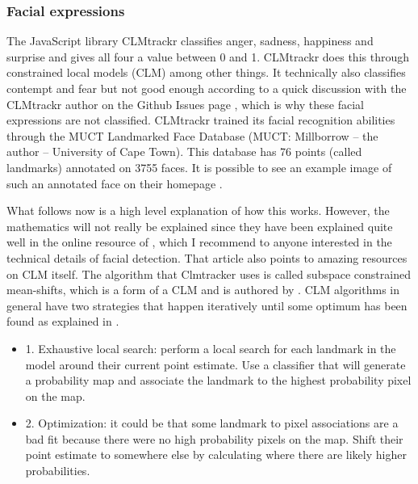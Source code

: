 \subsubsection{Facial expressions}
The JavaScript library CLMtrackr classifies anger, sadness, happiness and surprise and gives all four a value between 0 and 1. 
CLMtrackr does this through constrained local models (CLM) among other things. It technically also classifies contempt and fear but not good enough according to a quick discussion with the CLMtrackr author on the Github Issues page \cite{github_issue_clmtrackr}, which is why these facial expressions are not classified. CLMtrackr trained its facial recognition abilities through the MUCT Landmarked Face Database (MUCT: Millborrow -- the author -- University of Cape Town)\cite{milborrow2010}. This database has 76 points (called landmarks) annotated on 3755 faces. It is possible to see an example image of such an annotated face on their homepage \cite{milborrow2010}. 

What follows now is a high level explanation of how this works. However, the mathematics will not really be explained since they have been explained quite well in the online resource of \cite{auduno2014}, which I recommend to anyone interested in the technical details of facial detection. That article also points to amazing resources on CLM itself.
The algorithm that Clmtracker uses is called subspace constrained mean-shifts, which is a form of a CLM and is authored by \cite{saragih2009}. CLM algorithms in general have two strategies that happen iteratively until some optimum has been found as explained in \cite{saragih2009}. 

\begin{itemize}
    \item 1. Exhaustive local search: perform a local search for each landmark in the model around their current point estimate. Use a classifier that will generate a probability map and associate the landmark to the highest probability pixel on the map.
    \item 2. Optimization: it could be that some landmark to pixel associations are a bad fit because there were no high probability pixels on the map. Shift their point estimate to somewhere else by calculating where there are likely higher probabilities.
\end{itemize}

